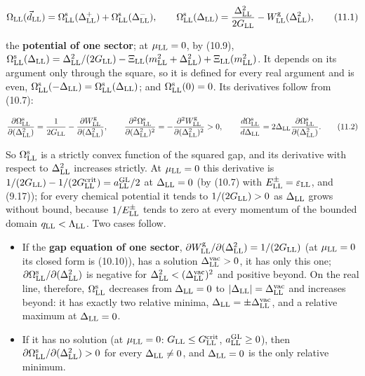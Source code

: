 \documentclass[
  10pt,
]{article}
\providecommand{\tightlist}{%
  \setlength{\itemsep}{0pt}\setlength{\parskip}{0pt}}
\begin{document}
\[\Omega_{\rm LL}(\vec d_{\rm LL})=\Omega^{\rm s}_{\rm LL}(\Delta^+_{\rm LL})+\Omega^{\rm s}_{\rm LL}(\Delta^-_{\rm LL}),\qquad\Omega^{\rm s}_{\rm LL}(\Delta_{\rm LL})=\frac{\Delta_{\rm LL}^2}{2G_{\rm LL}}-W^{\rm g}_{\rm LL}(\Delta_{\rm LL}^2),\tag{11.1}\]

the \textbf{potential of one sector}; at \(\mu_{\rm LL}=0\), by (10.9),
\(\Omega^{\rm s}_{\rm LL}(\Delta_{\rm LL})=\Delta_{\rm LL}^2/(2G_{\rm LL})-\Xi_{\rm LL}(m_{\rm LL}^2+\Delta_{\rm LL}^2)+\Xi_{\rm LL}(m_{\rm LL}^2)\).
It depends on its argument only through the square, so it is defined for
every real argument and is even,
\(\Omega^{\rm s}_{\rm LL}(-\Delta_{\rm LL})=\Omega^{\rm s}_{\rm LL}(\Delta_{\rm LL})\);
and \(\Omega^{\rm s}_{\rm LL}(0)=0\). Its derivatives follow from
(10.7):

\[\frac{\partial\Omega^{\rm s}_{\rm LL}}{\partial(\Delta_{\rm LL}^2)}=\frac1{2G_{\rm LL}}-\frac{\partial W^{\rm g}_{\rm LL}}{\partial(\Delta_{\rm LL}^2)},\qquad\frac{\partial^2\Omega^{\rm s}_{\rm LL}}{\partial(\Delta_{\rm LL}^2)^2}=-\frac{\partial^2W^{\rm g}_{\rm LL}}{\partial(\Delta_{\rm LL}^2)^2}>0,\qquad\frac{d\Omega^{\rm s}_{\rm LL}}{d\Delta_{\rm LL}}=2\Delta_{\rm LL}\frac{\partial\Omega^{\rm s}_{\rm LL}}{\partial(\Delta_{\rm LL}^2)}.\tag{11.2}\]

So \(\Omega^{\rm s}_{\rm LL}\) is a strictly convex function of the
squared gap, and its derivative with respect to \(\Delta_{\rm LL}^2\)
increases strictly. At \(\mu_{\rm LL}=0\) this derivative is
\(1/(2G_{\rm LL})-1/(2G^{\rm crit}_{\rm LL})=a^{\rm GL}_{\rm LL}/2\) at
\(\Delta_{\rm LL}=0\) (by (10.7) with
\(E^\pm_{\rm LL}=\varepsilon_{\rm LL}\), and (9.17)); for every chemical
potential it tends to \(1/(2G_{\rm LL})>0\) as \(\Delta_{\rm LL}\) grows
without bound, because \(1/E^\pm_{\rm LL}\) tends to zero at every
momentum of the bounded domain \(q_{\rm LL}<\Lambda_{\rm LL}\). Two
cases follow.

\begin{itemize}
\tightlist
\item
  If the \textbf{gap equation of one sector},
  \(\partial W^{\rm g}_{\rm LL}/\partial(\Delta_{\rm LL}^2)=1/(2G_{\rm LL})\)
  (at \(\mu_{\rm LL}=0\) its closed form is (10.10)), has a solution
  \(\Delta^{\rm vac}_{\rm LL}>0\), it has only this one;
  \(\partial\Omega^{\rm s}_{\rm LL}/\partial(\Delta_{\rm LL}^2)\) is
  negative for \(\Delta_{\rm LL}^2<(\Delta^{\rm vac}_{\rm LL})^2\) and
  positive beyond. On the real line, therefore,
  \(\Omega^{\rm s}_{\rm LL}\) decreases from \(\Delta_{\rm LL}=0\) to
  \(\lvert\Delta_{\rm LL}\rvert=\Delta^{\rm vac}_{\rm LL}\) and
  increases beyond: it has exactly two relative minima,
  \(\Delta_{\rm LL}=\pm\Delta^{\rm vac}_{\rm LL}\), and a relative
  maximum at \(\Delta_{\rm LL}=0\).
\item
  If it has no solution (at \(\mu_{\rm LL}=0\):
  \(G_{\rm LL}\le G^{\rm crit}_{\rm LL}\), \(a^{\rm GL}_{\rm LL}\ge0\)),
  then \(\partial\Omega^{\rm s}_{\rm LL}/\partial(\Delta_{\rm LL}^2)>0\)
  for every \(\Delta_{\rm LL}\ne0\), and \(\Delta_{\rm LL}=0\) is the
  only relative minimum.
\end{itemize}
\end{document}

